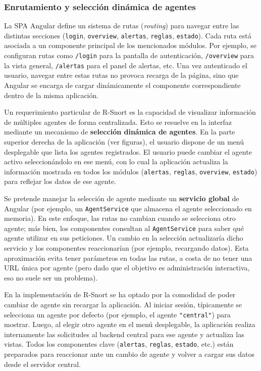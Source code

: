 \documentclass[11pt,a4paper,twoside]{report}
\begin{document}
\subsubsection{Enrutamiento y selección dinámica de agentes}

La SPA Angular define un sistema de rutas (\textit{routing}) para navegar entre las distintas secciones (\texttt{login}, \texttt{overview}, \texttt{alertas}, \texttt{reglas}, \texttt{estado}). Cada ruta está asociada a un componente principal de los mencionados módulos. Por ejemplo, se configuran rutas como \texttt{/login} para la pantalla de autenticación, \texttt{/overview} para la vista general, \texttt{/alertas} para el panel de alertas, etc. Una vez autenticado el usuario, navegar entre estas rutas no provoca recarga de la página, sino que Angular se encarga de cargar dinámicamente el componente correspondiente dentro de la misma aplicación.\newline

Un requerimiento particular de R-Snort es la capacidad de visualizar información de múltiples agentes de forma centralizada. Esto se resuelve en la interfaz mediante un mecanismo de \textbf{selección dinámica de agentes}. En la parte superior derecha de la aplicación (ver figuras), el usuario dispone de un menú desplegable que lista los agentes registrados. El usuario puede cambiar el agente activo seleccionándolo en ese menú, con lo cual la aplicación actualiza la información mostrada en todos los módulos (\texttt{alertas}, \texttt{reglas}, \texttt{overview}, \texttt{estado}) para reflejar los datos de ese agente.\newline

Se pretende manejar la selección de agente mediante un \textbf{servicio global} de Angular (por ejemplo, un \texttt{AgentService} que almacena el agente seleccionado en memoria). En este enfoque, las rutas no cambian cuando se selecciona otro agente; más bien, los componentes consultan al \texttt{AgentService} para saber qué agente utilizar en sus peticiones. Un cambio en la selección actualizaría dicho servicio y los componentes reaccionarían (por ejemplo, recargando datos). Esta aproximación evita tener parámetros en todas las rutas, a costa de no tener una URL única por agente (pero dado que el objetivo es administración interactiva, eso no suele ser un problema).\newline

En la implementación de R-Snort se ha optado por la comodidad de poder cambiar de agente sin recargar la aplicación. Al iniciar sesión, típicamente se selecciona un agente por defecto (por ejemplo, el agente \texttt{"central"}) para mostrar. Luego, al elegir otro agente en el menú desplegable, la aplicación realiza internamente las solicitudes al backend central para ese agente y actualiza las vistas. Todos los componentes clave (\texttt{alertas}, \texttt{reglas}, \texttt{estado}, etc.) están preparados para reaccionar ante un cambio de agente y volver a cargar sus datos desde el servidor central.\newline
\end{document}
